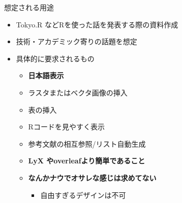 \documentclass[
  12pt,
  ignorenonframetext,
]{beamer}
\providecommand{\tightlist}{%
  \setlength{\itemsep}{0pt}\setlength{\parskip}{0pt}}
\begin{document}
\begin{frame}{想定される用途}
\protect\hypertarget{ux60f3ux5b9aux3055ux308cux308bux7528ux9014}{}

\begin{itemize}
\tightlist
\item
  Tokyo.R などRを使った話を発表する際の資料作成
\item
  技術・アカデミック寄りの話題を想定
\item
  具体的に要求されるもの

  \begin{itemize}
  \tightlist
  \item
    \textbf{日本語表示}
  \item
    ラスタまたはベクタ画像の挿入
  \item
    表の挿入
  \item
    Rコードを見やすく表示
  \item
    参考文献の相互参照/リスト自動生成
  \item
    \textbf{LyX やoverleafより簡単であること}
  \item
    \textbf{なんかナウでオサレな感じは求めてない}

    \begin{itemize}
    \tightlist
    \item
      自由すぎるデザインは不可
    \end{itemize}
  \end{itemize}
\end{itemize}

\end{frame}
\end{document}
